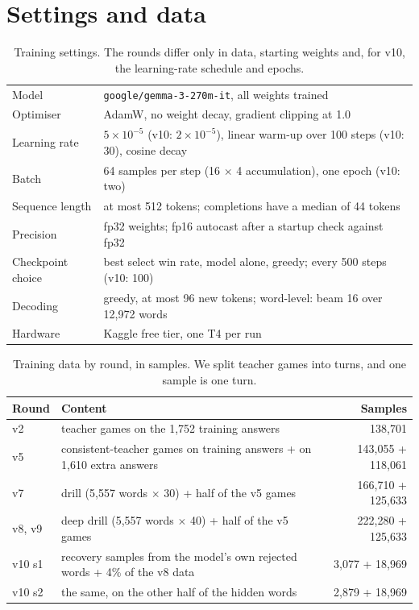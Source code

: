 \documentclass{article}
\begin{document}
\section{Settings and data}
\label{app:hparams}
\begin{table}[H]
\centering\small
\caption{Training settings. The rounds differ only in data, starting weights and, for v10, the learning-rate schedule and epochs.}
\begin{tabular}{ll}
\toprule
Model & \texttt{google/gemma-3-270m-it}, all weights trained \\
Optimiser & AdamW, no weight decay, gradient clipping at 1.0 \\
Learning rate & $5\times10^{-5}$ (v10: $2\times10^{-5}$), linear warm-up over 100 steps (v10: 30), cosine decay \\
Batch & 64 samples per step (16 $\times$ 4 accumulation), one epoch (v10: two) \\
Sequence length & at most 512 tokens; completions have a median of 44 tokens \\
Precision & fp32 weights; fp16 autocast after a startup check against fp32 \\
Checkpoint choice & best select win rate, model alone, greedy; every 500 steps (v10: 100) \\
Decoding & greedy, at most 96 new tokens; word-level: beam 16 over 12,972 words \\
Hardware & Kaggle free tier, one T4 per run \\
\bottomrule
\end{tabular}
\end{table}

\begin{table}[H]
\centering\small
\caption{Training data by round, in samples. We split teacher games into turns, and one sample is one turn.}
\begin{tabular}{llr}
\toprule
Round & Content & Samples \\
\midrule
v2 & teacher games on the 1,752 training answers & 138,701 \\
v5 & consistent-teacher games on training answers + on 1,610 extra answers & 143,055 + 118,061 \\
v7 & drill (5,557 words $\times$ 30) + half of the v5 games & 166,710 + 125,633 \\
v8, v9 & deep drill (5,557 words $\times$ 40) + half of the v5 games & 222,280 + 125,633 \\
v10 s1 & recovery samples from the model's own rejected words + 4\% of the v8 data & 3,077 + 18,969 \\
v10 s2 & the same, on the other half of the hidden words & 2,879 + 18,969 \\
\bottomrule
\end{tabular}
\end{table}
\end{document}
